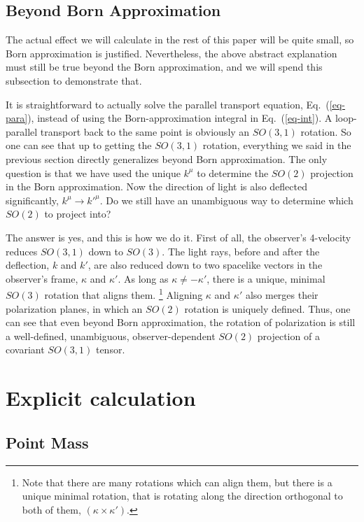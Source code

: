 \documentclass[aps,showpacs,twocolumn,floats,prd,superscriptaddress,nofootinbib]{revtex4-1}
\begin{document}
\subsection{Beyond Born Approximation}

The actual effect we will calculate in the rest of this paper will be quite small, so Born approximation is justified. 
Nevertheless, the above abstract explanation must still be true beyond the Born approximation, and we will spend this subsection to demonstrate that. 

It is straightforward to actually solve the parallel transport equation, Eq.~(\ref{eq-para}), instead of using the Born-approximation integral in Eq.~(\ref{eq-int}). 
A loop-parallel transport back to the same point is obviously an $SO(3,1)$ rotation.
So one can see that up to getting the $SO(3,1)$ rotation, everything we said in the previous section directly generalizes beyond Born approximation.
The only question is that we have used the unique $k^\mu$ to determine the $SO(2)$ projection in the Born approximation.
Now the direction of light is also deflected significantly, $k^\mu \rightarrow k'^\mu$. 
Do we still have an unambiguous way to determine which $SO(2)$ to project into?

The answer is yes, and this is how we do it. 
First of all, the observer's 4-velocity reduces $SO(3,1)$ down to $SO(3)$.
The light rays, before and after the deflection, $k$ and $k'$, are also reduced down to two spacelike vectors in the observer's frame, $\kappa$ and $\kappa'$.
As long as $\kappa\neq-\kappa'$, there is a unique, minimal $SO(3)$ rotation that aligns them.
\footnote{Note that there are many rotations which can align them, but there is a unique minimal rotation, that is rotating along the direction orthogonal to both of them, $(\kappa\times\kappa')$.}
Aligning $\kappa$ and $\kappa'$ also merges their polarization planes, in which an $SO(2)$ rotation is uniquely defined. 
Thus, one can see that even beyond Born approximation, the rotation of polarization is still a well-defined, unambiguous, observer-dependent $SO(2)$ projection of a covariant $SO(3,1)$ tensor.

\section{Explicit calculation}
\label{sec-Sch}

\subsection{Point Mass}
\end{document}
